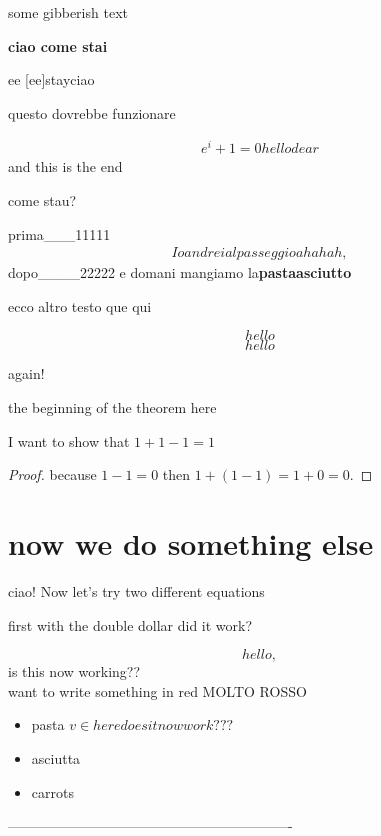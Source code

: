 
some gibberish text

\textbf{ciao come stai}

 ee
[ee]{stay}ciao

questo dovrebbe funzionare

\begin{align*}
e^i+1=0 hello dear
\end{align*}
and this is the end

come stau?

prima___11111
\begin{align}
Io andrei al passeggio ahahah,
\end{align}
dopo____22222
e domani mangiamo la\textbf{pastaasciutto}

ecco altro testo que {qui}


\begin{equation} hello \end{equation}
\begin{equation*} hello \end{equation*}

again! \centering

the beginning of the theorem {\Large here}
\begin{theorem}
I want to show that $1+1-1 = 1$
\end{theorem}
\begin{proof}
because $1-1=0$ then $1+(1-1)=1+0=0.$
\end{proof}

\section*{now we do something else}

ciao! Now let's try {\small two different equations}

first with the double dollar
did it work?

\[ hello, \] is this now working?? \\ want to write something in red {\color{red} MOLTO ROSSO }

\begin{itemize}

\item pasta $v \in here does it now work???$
\item asciutta

\item carrots
\end{itemize}

-------------------------------------------------------------

